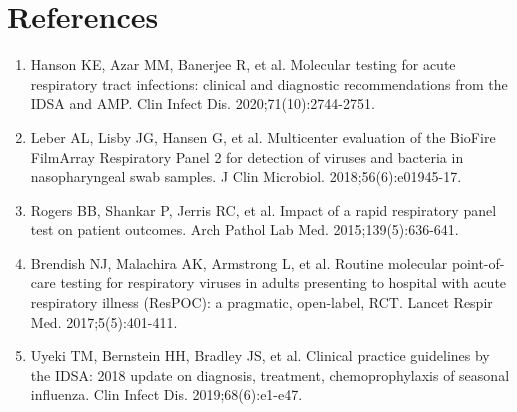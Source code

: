 \section*{References}
\begin{enumerate}
  \item Hanson KE, Azar MM, Banerjee R, et al. Molecular testing for acute respiratory tract infections: clinical and diagnostic recommendations from the IDSA and AMP. Clin Infect Dis. 2020;71(10):2744-2751.
  \item Leber AL, Lisby JG, Hansen G, et al. Multicenter evaluation of the BioFire FilmArray Respiratory Panel 2 for detection of viruses and bacteria in nasopharyngeal swab samples. J Clin Microbiol. 2018;56(6):e01945-17.
  \item Rogers BB, Shankar P, Jerris RC, et al. Impact of a rapid respiratory panel test on patient outcomes. Arch Pathol Lab Med. 2015;139(5):636-641.
  \item Brendish NJ, Malachira AK, Armstrong L, et al. Routine molecular point-of-care testing for respiratory viruses in adults presenting to hospital with acute respiratory illness (ResPOC): a pragmatic, open-label, RCT. Lancet Respir Med. 2017;5(5):401-411.
  \item Uyeki TM, Bernstein HH, Bradley JS, et al. Clinical practice guidelines by the IDSA: 2018 update on diagnosis, treatment, chemoprophylaxis of seasonal influenza. Clin Infect Dis. 2019;68(6):e1-e47.
\end{enumerate}

\clearpage
